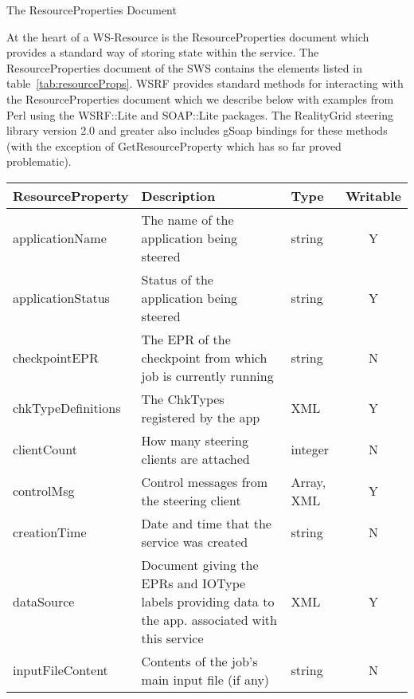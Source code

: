 \documentclass[a4paper]{article}
\begin{document}

\begin{section}{The ResourceProperties Document}
\label{sec:RPDoc}

At the heart of a WS-Resource is the ResourceProperties document which
provides a standard way of storing state within the service.  The
ResourceProperties document of the SWS contains the elements listed in
table~\ref{tab:resourceProps}.  WSRF provides standard methods for
interacting with the ResourceProperties document which we describe
below with examples from Perl using the WSRF::Lite and SOAP::Lite
packages.  The RealityGrid steering library version 2.0 and greater
also includes gSoap bindings for these methods (with the exception
of GetResourceProperty which has so far proved problematic).

\begin{table}
\begin{center}
\begin{tabular}{l|p{6cm}|l|c}
\hline\hline
ResourceProperty   & Description & Type & Writable\\
\hline
applicationName    & The name of the application being steered & string & Y\\
applicationStatus  & Status of the application being steered & string & Y\\
checkpointEPR      & The EPR of the checkpoint from which job is currently running & string & N\\
chkTypeDefinitions & The ChkTypes registered by the app & XML & Y\\
clientCount        & How many steering clients are attached & integer & N\\
controlMsg         & Control messages from the steering client & Array, XML & Y\\
creationTime       & Date and time that the service was created & string & N\\
dataSource         & Document giving the EPRs and IOType labels providing data to the app. associated with this service & XML & Y\\ 
inputFileContent   & Contents of the job's main input file (if any) & string & N\\


\end{tabular}
\end{center}
\end{table}
\end{section}
\end{document}

